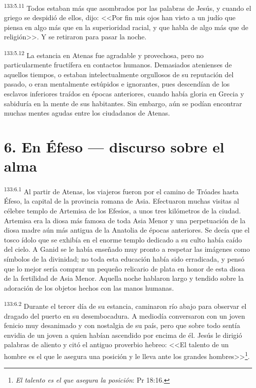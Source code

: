 \par 
\textsuperscript{133:5.11} Todos estaban más que asombrados por las palabras de Jesús, y cuando el griego se despidió de ellos, dijo: <<Por fin mis ojos han visto a un judío que piensa en algo más que en la superioridad racial, y que habla de algo más que de religión>>. Y se retiraron para pasar la noche.

\par 
\textsuperscript{133:5.12} La estancia en Atenas fue agradable y provechosa, pero no particularmente fructífera en contactos humanos. Demasiados atenienses de aquellos tiempos, o estaban intelectualmente orgullosos de su reputación del pasado, o eran mentalmente estúpidos e ignorantes, pues descendían de los esclavos inferiores traídos en épocas anteriores, cuando había gloria en Grecia y sabiduría en la mente de sus habitantes. Sin embargo, aún se podían encontrar muchas mentes agudas entre los ciudadanos de Atenas.

\section*{6. En Éfeso --- discurso sobre el alma}
\par 
\textsuperscript{133:6.1} Al partir de Atenas, los viajeros fueron por el camino de Tróades hasta Éfeso, la capital de la provincia romana de Asia. Efectuaron muchas visitas al célebre templo de Artemisa de los Efesios, a unos tres kilómetros de la ciudad. Artemisa era la diosa más famosa de toda Asia Menor y una perpetuación de la diosa madre aún más antigua de la Anatolia de épocas anteriores. Se decía que el tosco ídolo que se exhibía en el enorme templo dedicado a su culto había caído del cielo. A Ganid se le había enseñado muy pronto a respetar las imágenes como símbolos de la divinidad; no toda esta educación había sido erradicada, y pensó que lo mejor sería comprar un pequeño relicario de plata en honor de esta diosa de la fertilidad de Asia Menor. Aquella noche hablaron largo y tendido sobre la adoración de los objetos hechos con las manos humanas.

\par 
\textsuperscript{133:6.2} Durante el tercer día de su estancia, caminaron río abajo para observar el dragado del puerto en su desembocadura. A mediodía conversaron con un joven fenicio muy desanimado y con nostalgia de su país, pero que sobre todo sentía envidia de un joven a quien habían ascendido por encima de él. Jesús le dirigió palabras de aliento y citó el antiguo proverbio hebreo: <<El talento de un hombre es el que le asegura una posición y le lleva ante los grandes hombres>>\footnote{\textit{El talento es el que asegura la posición}: Pr 18:16.}.

